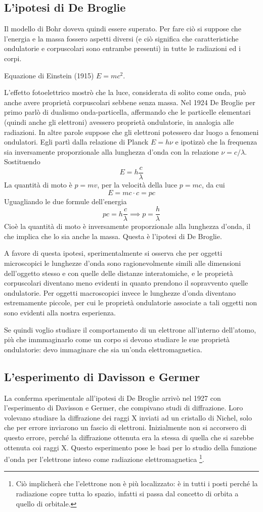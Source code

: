 \subsection{L'ipotesi di De Broglie}
Il modello di Bohr doveva quindi essere superato. Per fare ciò si suppose che l'energia e la massa fossero aspetti diversi (e ciò significa che caratteristiche ondulatorie e corpuscolari sono entrambe presenti) in tutte le radiazioni ed i corpi.

Equazione di Einstein (1915) $E=mc^2$.

L'effetto fotoelettrico mostrò che la luce, considerata di solito come onda, può anche avere proprietà corpuscolari sebbene senza massa. Nel 1924 De Broglie per primo parlò di dualismo onda-particella, affermando che le particelle elementari (quindi anche gli elettroni) avessero proprietà ondulatorie, in analogia alle radiazioni. In altre parole suppose che gli elettroni potessero dar luogo a fenomeni ondulatori. Egli partì dalla relazione di Planck $E=h\nu$ e ipotizzò che la frequenza sia inversamente proporzionale alla lunghezza d'onda con la relazione $\nu=c/\lambda$. Sostituendo
$$E=h\frac{c}{\lambda}$$
La quantità di moto è $p=mv$, per la velocità della luce $p=mc$, da cui
$$E=mc \cdot c=pc$$
Uguagliando le due formule dell'energia
$$pc=h\frac{c}{\lambda} \implies p=\frac{h}{\lambda}$$
Cioè la quantità di moto è inversamente proporzionale alla lunghezza d'onda, il che implica che lo sia anche la massa. Questa è l'ipotesi di De Broglie.

A favore di questa ipotesi, sperimentalmente si osserva che per oggetti microscopici le lunghezze d'onda sono ragionevolmente simili alle dimensioni dell'oggetto stesso e con quelle delle distanze interatomiche, e le proprietà corpuscolari diventano meno evidenti in quanto prendono il sopravvento quelle ondulatorie. Per oggetti macroscopici invece le lunghezze d'onda diventano estremamente piccole, per cui le proprietà ondulatorie associate a tali oggetti non sono evidenti alla nostra esperienza.

Se quindi voglio studiare il comportamento di un elettrone all'interno dell'atomo, più che immmaginarlo come un corpo si devono studiare le sue proprietà ondulatorie: devo immaginare che sia un'onda elettromagnetica.
\subsection{L'esperimento di Davisson e Germer}
La conferma sperimentale all'ipotesi di De Broglie arrivò nel 1927 con l'esperimento di Davisson e Germer, che compivano studi di diffrazione. Loro volevano studiare la diffrazione dei raggi X inviati ad un cristallo di Nichel, solo che per errore inviarono un fascio di elettroni. Inizialmente non si accorsero di questo errore, perché la diffrazione ottenuta era la stessa di quella che si sarebbe ottenuta coi raggi X.
Questo esperimento pose le basi per lo studio della funzione d'onda per l'elettrone inteso come radiazione elettromagnetica \footnote{Ciò implicherà che l'elettrone non è più localizzato: è in tutti i posti perché la radiazione copre tutta lo spazio, infatti si passa dal concetto di orbita a quello di orbitale.}.

